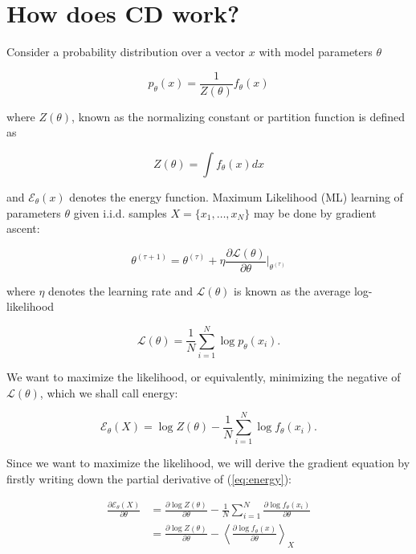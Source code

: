 \documentclass[11pt]{article}
\begin{document}
\section{How does CD work?}

Consider a probability distribution over a vector $x$ with model parameters $\theta$

\begin{equation}
p_\theta(x) = \frac{1}{Z(\theta)} f_\theta(x)
\end{equation}

where $Z(\theta)$, known as the normalizing constant or partition function is defined as

\begin{equation}
Z(\theta) = \int f_\theta(x) dx
\end{equation}

and $\mathcal{E}_\theta(x)$ denotes the energy function. Maximum Likelihood (ML) learning of parameters $\theta$ given i.i.d. samples $X=\{x_1,\ldots,x_N\}$ may be done by gradient ascent:

\begin{equation}
\theta^{(\tau+1)} = \theta^{(\tau)} + \eta \frac{\partial\mathcal{L}(\theta)}{\partial \theta} \bigg\vert_{\theta^{(\tau)}}
\end{equation}

where $\eta$ denotes the learning rate and $\mathcal{L}(\theta)$ is known as the average log-likelihood

\begin{equation}
\mathcal{L}(\theta) = \frac{1}{N} \sum_{i=1}^{N} \log p_\theta(x_i).
\end{equation} 

We want to maximize the likelihood, or equivalently, minimizing the negative of $\mathcal{L}(\theta)$, which we shall call energy:

\begin{equation}
\mathcal{E}_\theta(X) = \log Z(\theta) - \frac{1}{N} \sum_{i=1}^N \log f_\theta(x_i).
\label{eq:energy}
\end{equation}

Since we want to maximize the likelihood, we will derive the gradient equation by firstly writing down the partial derivative of (\ref{eq:energy}):

\begin{align}
\frac{\partial\mathcal{E}_\theta(X)}{\partial\theta}
&= \frac{\partial\log Z(\theta)}{\partial\theta} - \frac{1}{N}\sum_{i=1}^N\frac{\partial\log f_\theta(x_i)}{\partial\theta}\\
&= \frac{\partial\log Z (\theta)}{\partial\theta} - \left\langle\frac{\partial\log f_\theta (x)}{\partial\theta}\right\rangle_X 
\label{eq:gradient}
\end{align}
\end{document}
